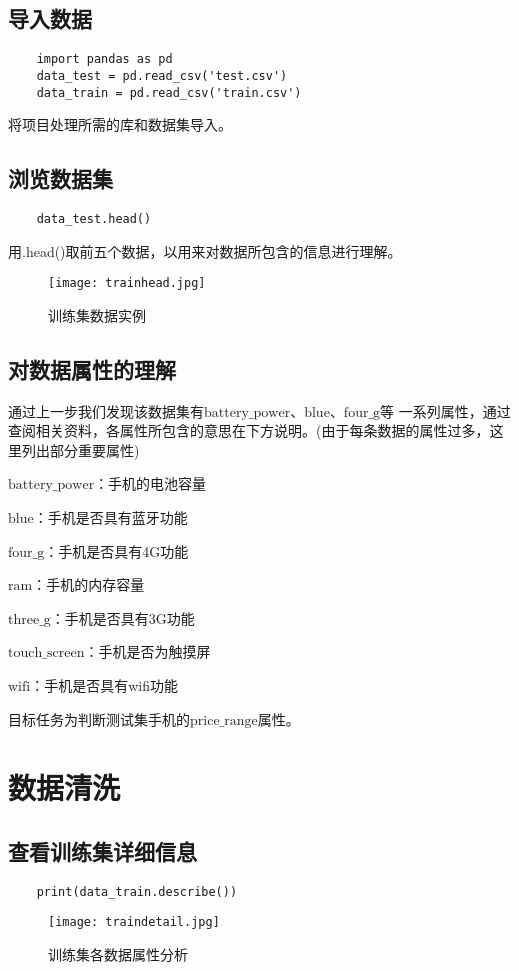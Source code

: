 \documentclass[AutoFakeBold]{LZUThesis}
\begin{document}
\section{导入数据}

\begin{lstlisting}
    import pandas as pd
    data_test = pd.read_csv('test.csv')
    data_train = pd.read_csv('train.csv')
\end{lstlisting}
将项目处理所需的库和数据集导入。

\section{浏览数据集}

\begin{lstlisting}
    data_test.head()
\end{lstlisting}
用.head()取前五个数据，以用来对数据所包含的信息进行理解。
\begin{figure}[htbp]
    \centering
    \texttt{[image: trainhead.jpg]}
    \caption{训练集数据实例}
\end{figure}
\section{对数据属性的理解}
通过上一步我们发现该数据集有$\mathrm{battery\_power}$、$\mathrm{blue}$、$\mathrm{four\_g}$等
一系列属性，通过查阅相关资料，各属性所包含的意思在下方说明。(由于每条数据的属性过多，这里列出部分重要属性)

$\mathrm{battery\_power}$：手机的电池容量

$\mathrm{blue}$：手机是否具有蓝牙功能

$\mathrm{four\_g}$：手机是否具有4G功能

$\mathrm{ram}$：手机的内存容量

$\mathrm{three\_g}$：手机是否具有3G功能

$\mathrm{touch\_screen}$：手机是否为触摸屏

$\mathrm{wifi}$：手机是否具有wifi功能

目标任务为判断测试集手机的$\mathrm{price\_range}$属性。
\chapter{数据清洗}
\section{查看训练集详细信息}
\begin{lstlisting}
    print(data_train.describe())  
\end{lstlisting}
    \begin{figure}[htbp]
        \centering
        \texttt{[image: traindetail.jpg]}
        \caption{训练集各数据属性分析}
    \end{figure}
\end{document}
